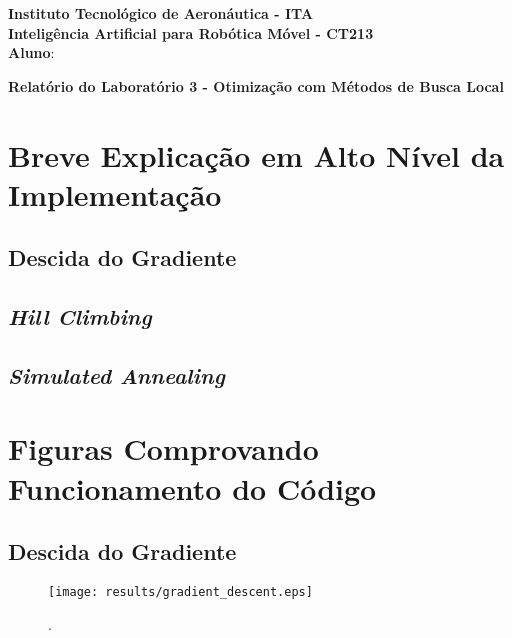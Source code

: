 \documentclass[brazil, 12pt]{article}
\begin{document}
\begin{center}
\textbf{Instituto Tecnológico de Aeronáutica - ITA} \\
\textbf{Inteligência Artificial para Robótica Móvel - CT213} \\
\textbf{Aluno}:     %
\end{center}

\begin{center}
\textbf{Relatório do Laboratório 3 - Otimização com Métodos de Busca Local}
\end{center}
\vspace*{0.5cm}

\section{Breve Explicação em Alto Nível da Implementação}

\subsection{Descida do Gradiente}

\subsection{\emph{Hill Climbing}}

\subsection{\emph{Simulated Annealing}}



\section{Figuras Comprovando Funcionamento do Código}

\subsection{Descida do Gradiente}
\begin{figure}[H]
\centering
\texttt{[image: results/gradient\_descent.eps]} %
\caption{.} %
\label{fig:gradient_descent}  %
\end{figure} 
\end{document}
